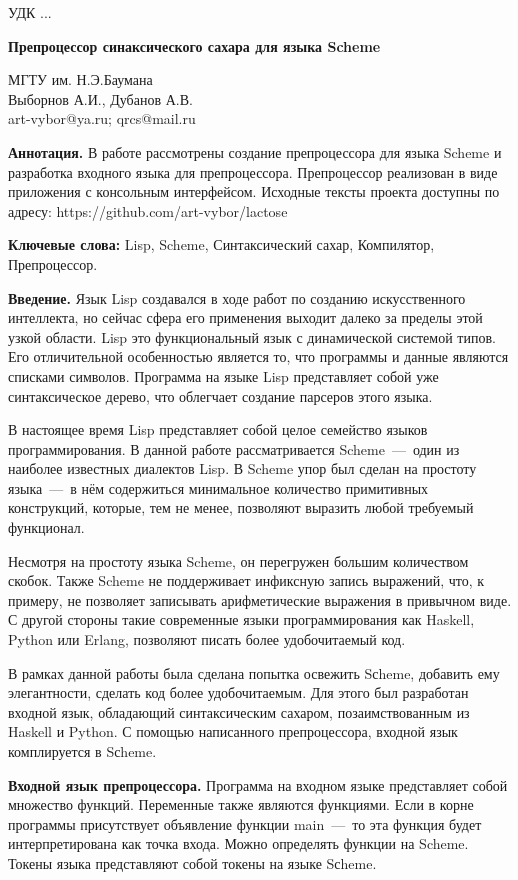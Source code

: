 \documentclass[12pt,a4paper,oneside]{extarticle}
\begin{document}
\noindent УДК ...
\bigskip

\noindent\textbf{Препроцессор синаксического сахара для языка Scheme}

\noindent МГТУ им. Н.Э.Баумана\\
Выборнов А.И., Дубанов А.В.\\
art-vybor@ya.ru; qrcs@mail.ru

\noindent\textbf{Аннотация.} В работе рассмотрены создание препроцессора для языка Scheme и разработка входного языка для препроцессора. Препроцессор реализован в виде приложения с консольным интерфейсом. Исходные тексты проекта доступны по адресу: https://github.com/art-vybor/lactose

\noindent\textbf{Ключевые слова:} Lisp, Scheme, Синтаксический сахар, Компилятор, Препроцессор.

\bigskip

\noindent\textbf{Введение.}
Язык Lisp создавался в ходе работ по созданию искусственного интеллекта, но сейчас сфера его применения выходит далеко за пределы этой узкой области. Lisp это функциональный язык с динамической системой типов.
Его отличительной особенностью является то, что программы и данные являются списками символов.
Программа на языке Lisp представляет собой уже синтаксическое дерево, что облегчает создание парсеров этого языка.

В настоящее время Lisp представляет собой целое семейство языков программирования.
В данной работе рассматривается Scheme~---~один из наиболее известных диалектов Lisp.
В Scheme упор был сделан на простоту языка~---~в нём содержиться минимальное количество примитивных конструкций, которые, тем не менее, позволяют выразить любой требуемый функционал.

Несмотря на простоту языка Scheme, он перегружен большим количеством скобок.
Также Scheme не поддерживает инфиксную запись выражений, что, к примеру, не позволяет записывать арифметические выражения в привычном виде.
С другой стороны такие современные языки программирования как Haskell, Python или Erlang, позволяют писать более удобочитаемый код.

В рамках данной работы была сделана попытка освежить Sсheme, добавить ему элегантности, сделать код более удобочитаемым.
Для этого был разработан входной язык, обладающий синтаксическим сахаром, позаимствованным из Haskell и Python.
С помощью написанного препроцессора, входной язык комплируется в Sсheme.

\noindent\textbf{Входной язык препроцессора.}
Программа на входном языке представляет собой множество функций. Переменные также являются функциями. Если в корне программы присутствует объявление функции main~---~то эта функция будет интерпретирована как точка входа. Можно определять функции на Scheme. Токены языка представляют собой токены на языке Sсheme.
\end{document}
